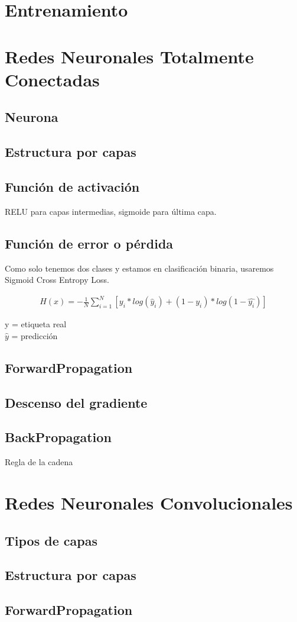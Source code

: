 \section{Entrenamiento}

\section{Redes Neuronales Totalmente Conectadas}

\subsection{Neurona}
\subsection{Estructura por capas}
\subsection{Función de activación}

RELU para capas intermedias, sigmoide para última capa.

\subsection{Función de error o pérdida}

Como solo tenemos dos clases y estamos en clasificación binaria, usaremos Sigmoid Cross Entropy Loss.

\begin{gather}
   H(x) = - \frac{1}{N} \sum_{i=1}^{N}  [y_i * log( \hat{y}_i) + (1-y_i)*log(1-\hat{y_i})]
   \label{loss_func}
\end{gather}

y = etiqueta real \\
$\hat{y}$ = predicción 

\subsection{ForwardPropagation}
\subsection{Descenso del gradiente}
\subsection{BackPropagation}
Regla de la cadena

\section{Redes Neuronales Convolucionales}

\subsection{Tipos de capas}

\subsection{Estructura por capas}

\subsection{ForwardPropagation}
